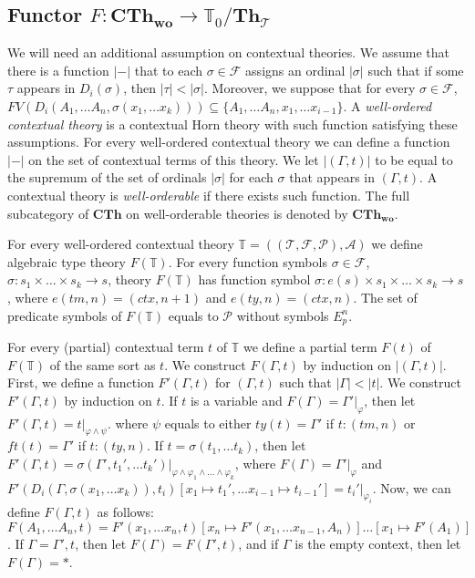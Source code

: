 \documentclass[reqno]{amsart}
\theoremstyle{definition}
\theoremstyle{remark}
\newcommand{\cat}[1]{\mathbf{#1}}
\newcommand{\Th}{\cat{Th}}
\newcommand{\CTh}{\cat{CTh}}
\newcommand{\woCTh}{\cat{CTh_{wo}}}
\newcommand{\ThT}{\Th_{\mathcal{T}}}
\numberwithin{figure}{section}
\begin{document}
\subsection{Functor $F : \woCTh \to \mathbb{T}_0/\ThT$}

We will need an additional assumption on contextual theories.
We assume that there is a function $|-|$ that to each $\sigma \in \mathcal{F}$ assigns an ordinal $|\sigma|$ such that if some $\tau$ appears in $D_i(\sigma)$, then $|\tau| < |\sigma|$.
Moreover, we suppose that for every $\sigma \in \mathcal{F}$, $FV(D_i(A_1, \ldots A_n, \sigma(x_1, \ldots x_k))) \subseteq \{ A_1, \ldots A_n, x_1, \ldots x_{i-1} \}$.
A \emph{well-ordered contextual theory} is a contextual Horn theory with such function satisfying these assumptions.
For every well-ordered contextual theory we can define a function $|-|$ on the set of contextual terms of this theory.
We let $|(\Gamma,t)|$ to be equal to the supremum of the set of ordinals $|\sigma|$ for each $\sigma$ that appears in $(\Gamma,t)$.
A contextual theory is \emph{well-orderable} if there exists such function.
The full subcategory of $\CTh$ on well-orderable theories is denoted by $\woCTh$.

For every well-ordered contextual theory $\mathbb{T} = ((\mathcal{T},\mathcal{F},\mathcal{P}),\mathcal{A})$ we define algebraic type theory $F(\mathbb{T})$.
For every function symbols $\sigma \in \mathcal{F}$, $\sigma : s_1 \times \ldots \times s_k \to s$,
    theory $F(\mathbb{T})$ has function symbol $\sigma : e(s) \times s_1 \times \ldots \times s_k \to s$,
    where $e(tm,n) = (ctx,n+1)$ and $e(ty,n) = (ctx,n)$.
The set of predicate symbols of $F(\mathbb{T})$ equals to $\mathcal{P}$ without symbols $E^n_p$.

For every (partial) contextual term $t$ of $\mathbb{T}$ we define a partial term $F(t)$ of $F(\mathbb{T})$ of the same sort as $t$.
We construct $F(\Gamma,t)$ by induction on $|(\Gamma,t)|$.
First, we define a function $F'(\Gamma,t)$ for $(\Gamma,t)$ such that $|\Gamma| < |t|$.
We construct $F'(\Gamma,t)$ by induction on $t$.
If $t$ is a variable and $F(\Gamma) = \Gamma'|_\varphi$, then let $F'(\Gamma,t) = t|_{\varphi \land \psi}$.
    where $\psi$ equals to either $ty(t) = \Gamma'$ if $t : (tm,n)$ or $ft(t) = \Gamma'$ if $t : (ty,n)$. 
If $t = \sigma(t_1, \ldots t_k)$, then let $F'(\Gamma,t) = \sigma(\Gamma', t_1', \ldots t_k')|_{\varphi \land \varphi_1 \land \ldots \land \varphi_k}$,
    where $F(\Gamma) = \Gamma'|_\varphi$ and $F'(D_i(\Gamma,\sigma(x_1, \ldots x_k)), t_i)[x_1 \mapsto t_1', \ldots x_{i-1} \mapsto t_{i-1}'] = t_i'|_{\varphi_i}$.
Now, we can define $F(\Gamma,t)$ as follows: $F(A_1, \ldots A_n, t) = F'(x_1, \ldots x_n, t)[x_n \mapsto F'(x_1, \ldots x_{n-1}, A_n)] \ldots \allowbreak [x_1 \mapsto F'(A_1)]$.
If $\Gamma = \Gamma',t$, then let $F(\Gamma) = F(\Gamma',t)$, and if $\Gamma$ is the empty context, then let $F(\Gamma) = *$.
\end{document}
